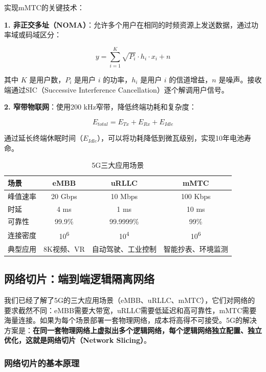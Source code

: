 实现mMTC的关键技术：

\textbf{1. 非正交多址（NOMA）}：允许多个用户在相同的时频资源上发送数据，通过功率域或码域区分：

\begin{equation}
y = \sum_{i=1}^{K} \sqrt{P_i} \cdot h_i \cdot x_i + n
\end{equation}

其中 $K$ 是用户数，$P_i$ 是用户 $i$ 的功率，$h_i$ 是用户 $i$ 的信道增益，$n$ 是噪声。接收端通过SIC（Successive Interference Cancellation）逐个解调用户信号。

\textbf{2. 窄带物联网}：使用200 kHz窄带，降低终端功耗和复杂度：

\begin{equation}
E_{total} = E_{Tx} + E_{Rx} + E_{Idle}
\end{equation}

通过延长终端休眠时间（$E_{Idle}$），可以将功耗降低到微瓦级别，实现10年电池寿命。

\begin{table}[htbp]
\centering
\caption{5G三大应用场景}
\begin{tabular}{|l|c|c|c|}
\hline
\textbf{场景} & \textbf{eMBB} & \textbf{uRLLC} & \textbf{mMTC} \\
\hline
峰值速率 & 20 Gbps & 10 Mbps & 100 Kbps \\
时延 & 4 ms & 1 ms & 10 ms \\
可靠性 & 99.9\% & 99.9999\% & 99\% \\
连接密度 & 10\textsuperscript{6} & 10\textsuperscript{4} & 10\textsuperscript{6} \\
典型应用 & 8K视频、VR & 自动驾驶、工业控制 & 智能抄表、环境监测 \\
\hline
\end{tabular}
\end{table}

\subsection{网络切片：端到端逻辑隔离网络}

我们已经了解了5G的三大应用场景（eMBB、uRLLC、mMTC），它们对网络的要求截然不同：eMBB需要大带宽，uRLLC需要低延迟和高可靠性，mMTC需要海量连接。如果为每个场景部署一套物理网络，成本将高得不可接受。5G的解决方案是：\textbf{在同一套物理网络上虚拟出多个逻辑网络，每个逻辑网络独立配置、独立优化，这就是网络切片（Network Slicing）}。

\subsubsection{网络切片的基本原理}

